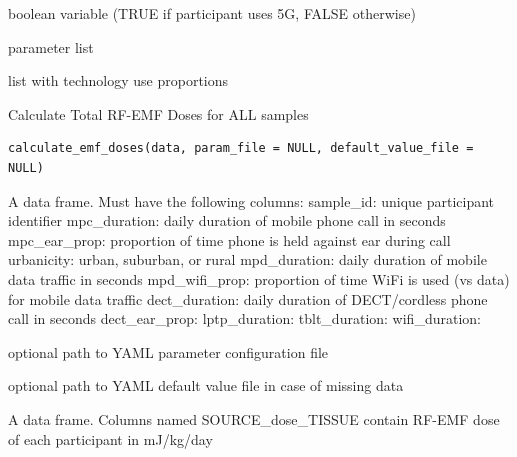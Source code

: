 \documentclass[a4paper]{book}
\begin{document}
%
\begin{Arguments}
\begin{ldescription}
\item[\code{use\_5g}] boolean variable (TRUE if participant uses 5G, FALSE otherwise)

\item[\code{params}] parameter list
\end{ldescription}
\end{Arguments}
%
\begin{Value}
list with technology use proportions
\end{Value}
%
\begin{Description}
Calculate Total RF-EMF Doses for ALL samples
\end{Description}
%
\begin{Usage}
\begin{verbatim}
calculate_emf_doses(data, param_file = NULL, default_value_file = NULL)
\end{verbatim}
\end{Usage}
%
\begin{Arguments}
\begin{ldescription}
\item[\code{data}] A data frame. Must have the following columns:
sample\_id: unique participant identifier
mpc\_duration: daily duration of mobile phone call in seconds
mpc\_ear\_prop: proportion of time phone is held against ear during call
urbanicity: urban, suburban, or rural
mpd\_duration: daily duration of mobile data traffic in seconds
mpd\_wifi\_prop: proportion of time WiFi is used (vs data) for mobile data traffic
dect\_duration: daily duration of DECT/cordless phone call in seconds
dect\_ear\_prop:
lptp\_duration:
tblt\_duration:
wifi\_duration:

\item[\code{param\_file}] optional path to YAML parameter configuration file

\item[\code{default\_value\_file}] optional path to YAML default value file in case of missing data
\end{ldescription}
\end{Arguments}
%
\begin{Value}
A data frame. Columns named SOURCE\_dose\_TISSUE contain RF-EMF dose
of each participant in mJ/kg/day
\end{Value}
\end{document}
